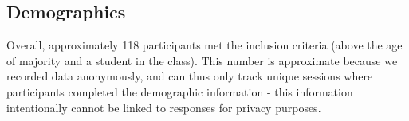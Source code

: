 \documentclass[runningheads
]{llncs}
\begin{document}
\hypertarget{demographics}{%
\subsection{Demographics}\label{demographics}}

Overall, approximately 118 participants met the inclusion criteria
(above the age of majority and a student in the class). This number is
approximate because we recorded data anonymously, and can thus only
track unique sessions where participants completed the demographic
information - this information intentionally cannot be linked to
responses for privacy purposes.

\begin{figure}

\begin{minipage}[t]{0.33\linewidth}

{\centering 


}

\end{minipage}%
%
\begin{minipage}[t]{0.33\linewidth}

{\centering 

\raisebox{-\height}{

}}
\end{minipage}
\end{figure}
\end{document}
